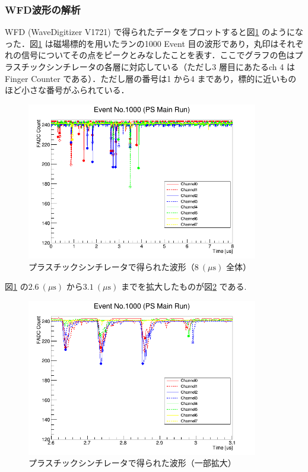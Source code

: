 \subsubsection{WFD波形の解析}
\label{subsubsec:PSEventDisplay}
WFD (WaveDigitizer V1721) で得られたデータをプロットすると図\ref{fig:PSEventDisplayAll} のようになった．図\ref{fig:PSEventDisplayAll} は磁場標的を用いたランの1000 Event 目の波形であり，丸印はそれぞれの信号についてその点をピークとみなしたことを表す．ここでグラフの色はプラスチックシンチレータの各層に対応している（ただし3 層目にあたるch 4 はFinger Counter である）．ただし層の番号は1 から4 まであり，標的に近いものほど小さな番号がふられている．
\begin{figure}[h]
	\centering
	\includegraphics[width = 0.9\textwidth]{figure/odagawa/PSEventDisplayAll.png}
	\caption{プラスチックシンチレータで得られた波形（$8~(\mu\mathrm{s})$ 全体）}
	\label{fig:PSEventDisplayAll}
\end{figure}%

図\ref{fig:PSEventDisplayAll} の$2.6~(\mu\mathrm{s})$ から$3.1~(\mu\mathrm{s})$ までを拡大したものが図\ref{fig:PSEventDisplayZoom} である.

\begin{figure}[h]
	\centering
	\includegraphics[width = 0.9\textwidth]{figure/odagawa/PSEventDisplayZoom.png}
	\caption{プラスチックシンチレータで得られた波形（一部拡大）}
	\label{fig:PSEventDisplayZoom}
\end{figure}%

